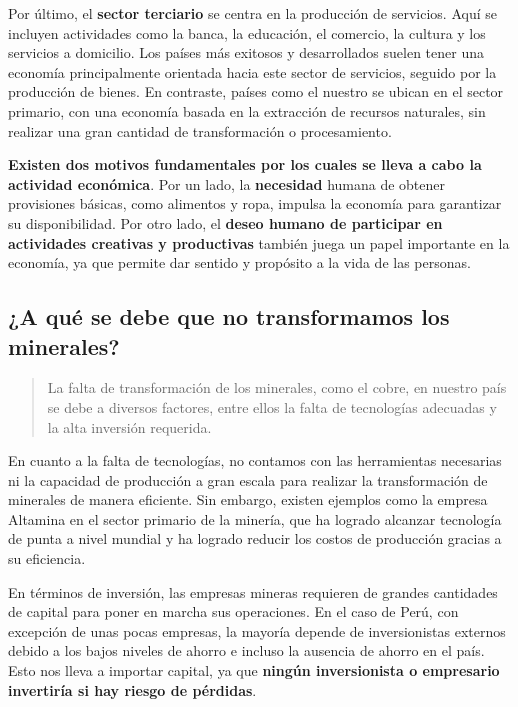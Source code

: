 \documentclass[
  a4paper,
]{article}
\begin{document}
Por último, el \textbf{sector terciario} se centra en la producción de
servicios. Aquí se incluyen actividades como la banca, la educación, el
comercio, la cultura y los servicios a domicilio. Los países más
exitosos y desarrollados suelen tener una economía principalmente
orientada hacia este sector de servicios, seguido por la producción de
bienes. En contraste, países como el nuestro se ubican en el sector
primario, con una economía basada en la extracción de recursos
naturales, sin realizar una gran cantidad de transformación o
procesamiento.

\textbf{Existen dos motivos fundamentales por los cuales se lleva a cabo
la actividad económica}. Por un lado, la \textbf{necesidad} humana de
obtener provisiones básicas, como alimentos y ropa, impulsa la economía
para garantizar su disponibilidad. Por otro lado, el \textbf{deseo
humano de participar en actividades creativas y productivas} también
juega un papel importante en la economía, ya que permite dar sentido y
propósito a la vida de las personas.

\subsection{¿A qué se debe que no transformamos los
minerales?}\label{a-quuxe9-se-debe-que-no-transformamos-los-minerales}

\begin{quote}
La falta de transformación de los minerales, como el cobre, en nuestro
país se debe a diversos factores, entre ellos la falta de tecnologías
adecuadas y la alta inversión requerida.
\end{quote}

En cuanto a la falta de tecnologías, no contamos con las herramientas
necesarias ni la capacidad de producción a gran escala para realizar la
transformación de minerales de manera eficiente. Sin embargo, existen
ejemplos como la empresa Altamina en el sector primario de la minería,
que ha logrado alcanzar tecnología de punta a nivel mundial y ha logrado
reducir los costos de producción gracias a su eficiencia.

En términos de inversión, las empresas mineras requieren de grandes
cantidades de capital para poner en marcha sus operaciones. En el caso
de Perú, con excepción de unas pocas empresas, la mayoría depende de
inversionistas externos debido a los bajos niveles de ahorro e incluso
la ausencia de ahorro en el país. Esto nos lleva a importar capital, ya
que \textbf{ningún inversionista o empresario invertiría si hay riesgo
de pérdidas}.
\end{document}
